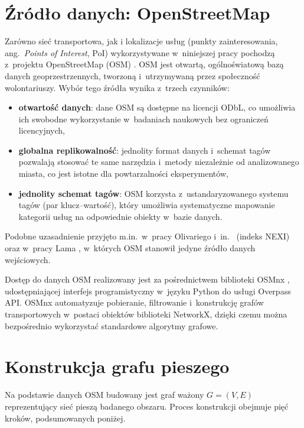 \label{chap:dane_i_model}

\section{Źródło danych: OpenStreetMap}
\label{sec:dane:osm}

Zarówno sieć transportowa, jak i lokalizacje usług (punkty zainteresowania, ang.\ \emph{Points of Interest}, PoI)
wykorzystywane w~niniejszej pracy pochodzą z~projektu OpenStreetMap (OSM) \cite{openstreetmap}.
OSM jest otwartą, ogólnoświatową bazą danych geoprzestrzennych, tworzoną i~utrzymywaną przez społeczność wolontariuszy.
Wybór tego źródła wynika z~trzech czynników:
\begin{itemize}
  \item \textbf{otwartość danych}: dane OSM są dostępne na licencji ODbL,
        co umożliwia ich swobodne wykorzystanie w~badaniach naukowych bez ograniczeń licencyjnych,
  \item \textbf{globalna replikowalność}: jednolity format danych i~schemat tagów pozwalają
        stosować te same narzędzia i~metody niezależnie od analizowanego miasta,
        co jest istotne dla powtarzalności eksperymentów,
  \item \textbf{jednolity schemat tagów}: OSM korzysta z~ustandaryzowanego systemu tagów
        (par klucz--wartość), który umożliwia systematyczne mapowanie kategorii usług
        na odpowiednie obiekty w~bazie danych.
\end{itemize}
Podobne uzasadnienie przyjęto m.in.\ w~pracy Olivariego i~in.\ \cite{olivari2023presenting}
(indeks NEXI) oraz w~pracy Lama \cite{Lam2024}, w~których OSM stanowił jedyne źródło danych wejściowych.

Dostęp do danych OSM realizowany jest za pośrednictwem biblioteki OSMnx \cite{boeing2017osmnx},
udostępniającej interfejs programistyczny w~języku Python do usługi Overpass API.
OSMnx automatyzuje pobieranie, filtrowanie i~konstrukcję grafów transportowych w~postaci obiektów
biblioteki NetworkX, dzięki czemu można bezpośrednio wykorzystać standardowe algorytmy grafowe.

\clearpage

\section{Konstrukcja grafu pieszego}
\label{sec:dane:graf}

Na podstawie danych OSM budowany jest graf ważony $G=(V,E)$ reprezentujący sieć pieszą badanego obszaru.
Proces konstrukcji obejmuje pięć kroków, podsumowanych poniżej.

